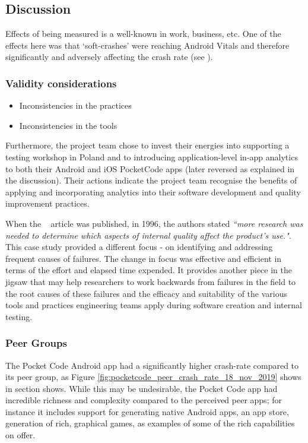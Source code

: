 \subsection{Discussion}
Effects of being measured is a well-known in work, business, etc. One of the effects here was that `soft-crashes' were reaching Android Vitals and therefore significantly and adversely affecting the crash rate (see \cite{CATDROID-426-JIRA}).

\subsubsection{Validity considerations}
\begin{itemize}
    \item Inconsistencies in the practices
    \item Inconsistencies in the tools
\end{itemize}

Furthermore, the project team chose to invest their energies into supporting a testing workshop in Poland and to introducing application-level in-app analytics to both their Android and iOS PocketCode apps (later reversed as explained in the discussion). Their actions indicate the project team recognise the benefits of applying and incorporating analytics into their software development and quality improvement practices.

When the ~\citep{kitchenham1996_software_quality_elusive_target} article was published, in 1996, the authors stated \emph{``more research was needed to determine which aspects of internal quality affect the product's use."}. This case study provided a different focus - on identifying and addressing frequent causes of failures. The change in focus was effective and efficient in terms of the effort and elapsed time expended. It provides another piece in the jigsaw that may help researchers to work backwards from failures in the field to the root causes of these failures and the efficacy and suitability of the various tools and practices engineering teams apply during software creation and internal testing.

\subsubsection{Peer Groups}
The Pocket Code Android app had a significantly higher crash-rate compared to its peer group, as Figure \ref{fig:pocketcode_peer_crash_rate_18_nov_2019} shows in section \href{android-vitals-peer-groups}{\emph{}} shows. While this may be undesirable, the Pocket Code app had incredible richness and complexity compared to the perceived peer apps; for instance it includes support for generating native Android apps, an app store, generation of rich, graphical games, as examples of some of the rich capabilities on offer.


